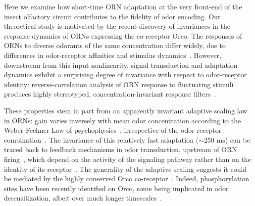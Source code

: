 \documentclass[9pt,twocolumn,twoside]{pnas-new}
\begin{document}
Here we examine how short-time ORN adaptation at the very front-end of the insect olfactory circuit contributes to the fidelity of odor encoding. Our theoretical study is motivated by the recent discovery of invariances in the response dynamics of ORNs expressing the co-receptor Orco. %
The responses of ORNs to diverse odorants of the same concentration differ widely, due to differences in odor-receptor affinities \cite{hallem_carlson,montague2011similar,geosmin} and stimulus dynamics~\cite{martelli}. However, downstream from this input nonlinearity, signal transduction and adaptation dynamics exhibit a surprising degree of invariance with respect to odor-receptor identity: reverse-correlation analysis of ORN response to fluctuating stimuli produces highly stereotyped, concentration-invariant response filters~\cite{martelli,si2017invariances, srinivas_elife}.

These properties stem in part from an apparently invariant adaptive scaling law in ORNs: gain varies inversely with mean odor concentration according to the Weber-Fechner Law of psychophysics~\cite{weber1996eh,fechner2012elemente}, irrespective of the odor-receptor combination~\cite{srinivas_elife,cafaro_WL,cao_WL}. The invariance of this relatively fast adaptation ($\sim$250 ms) can be traced back to  feedback mechanisms in odor transduction, upstream of ORN firing~\cite{nagel_wilson_biophysical,cao_WL,cafaro_WL,srinivas_elife}, which depend on the activity of the signaling pathway rather than on the identity of its receptor~\cite{nagel_wilson_biophysical}. 
The generality of the adaptive scaling suggests it could be mediated by the highly conserved Orco co-receptor~\cite{orco_structure,getahun2013insect,getahun2016intracellular,Guo_Smith}. Indeed, phosphorylation sites have been recently identified on Orco, some being implicated in odor desensitization, albeit over much longer timescales~\cite{Guo_Smith_review,Guo_Smith}. 
\end{document}
